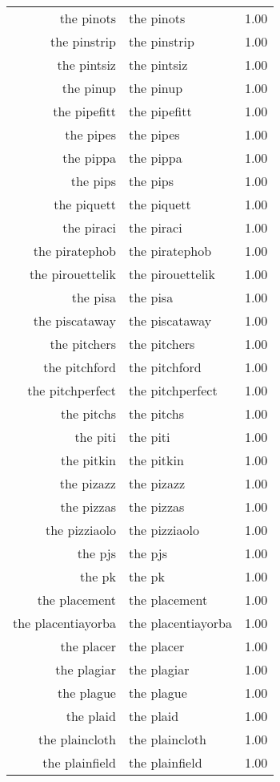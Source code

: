 \begin{table}[ht]
\begin{tabular}{rlr}
  the pinots & the pinots & 1.00 \\ 
  the pinstrip & the pinstrip & 1.00 \\ 
  the pintsiz & the pintsiz & 1.00 \\ 
  the pinup & the pinup & 1.00 \\ 
  the pipefitt & the pipefitt & 1.00 \\ 
  the pipes & the pipes & 1.00 \\ 
  the pippa & the pippa & 1.00 \\ 
  the pips & the pips & 1.00 \\ 
  the piquett & the piquett & 1.00 \\ 
  the piraci & the piraci & 1.00 \\ 
  the piratephob & the piratephob & 1.00 \\ 
  the pirouettelik & the pirouettelik & 1.00 \\ 
  the pisa & the pisa & 1.00 \\ 
  the piscataway & the piscataway & 1.00 \\ 
  the pitchers & the pitchers & 1.00 \\ 
  the pitchford & the pitchford & 1.00 \\ 
  the pitchperfect & the pitchperfect & 1.00 \\ 
  the pitchs & the pitchs & 1.00 \\ 
  the piti & the piti & 1.00 \\ 
  the pitkin & the pitkin & 1.00 \\ 
  the pizazz & the pizazz & 1.00 \\ 
  the pizzas & the pizzas & 1.00 \\ 
  the pizziaolo & the pizziaolo & 1.00 \\ 
  the pjs & the pjs & 1.00 \\ 
  the pk & the pk & 1.00 \\ 
  the placement & the placement & 1.00 \\ 
  the placentiayorba & the placentiayorba & 1.00 \\ 
  the placer & the placer & 1.00 \\ 
  the plagiar & the plagiar & 1.00 \\ 
  the plague & the plague & 1.00 \\ 
  the plaid & the plaid & 1.00 \\ 
  the plaincloth & the plaincloth & 1.00 \\ 
  the plainfield & the plainfield & 1.00 \\ 

\end{tabular}
\end{table}
